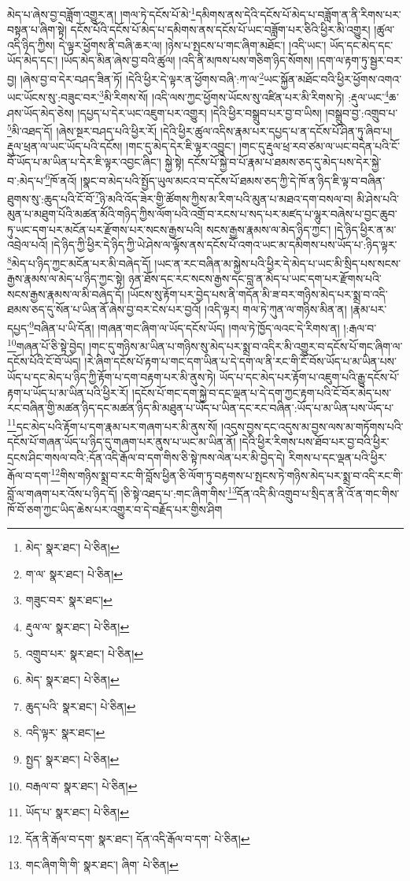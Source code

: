 མེད་པ་ཞེས་བྱ་བཟློག་འགྱུར་ན། །གལ་ཏེ་དངོས་པོ་མེ་\footnote{མེད་  སྣར་ཐང་།  པེ་ཅིན། }དམིགས་ནས་དེའི་དངོས་པོ་མེད་པ་བཟློག་ན་ནི་རིགས་པར་བསྟན་པ་ཞིག་སྟེ། དངོས་པོའི་དངོས་པོ་མེད་པ་དམིགས་ནས་དངོས་པོ་ཡང་བཟློག་པར་ཅིའི་ཕྱིར་མི་འགྱུར། །ཚུལ་འདི་ཉིད་ཀྱིས། དེ་ལྟར་ཕྱོགས་ནི་བཞི་ཆར་ལ། །ཉེས་པ་སྤངས་པ་གང་ཞིག་མཐོང་། །འདི་ཡང་། ཡོད་དང་མེད་དང་ཡོད་མེད་དང་། །ཡོད་མེད་མིན་ཞེས་བྱ་བའི་ཚུལ། །འདི་ནི་མཁས་པས་གཅིག་ཉིད་སོགས། །དག་ལ་རྟག་ཏུ་སྦྱར་བར་བྱ། །ཞེས་བྱ་བ་དེར་བཤད་ཟིན་ཏོ། །དེའི་ཕྱིར་དེ་ལྟར་ན་ཕྱོགས་བཞི་:ཀ་ལ་\footnote{ག་ལ་  སྣར་ཐང་།  པེ་ཅིན། }ཡང་སྐྱོན་མཐོང་བའི་ཕྱིར་ཕྱོགས་འགའ་ཡང་ཡོངས་སུ་:བཟུང་བར་\footnote{གཟུང་བར་  སྣར་ཐང་། }མི་རིགས་སོ། །འདི་ལས་ཀྱང་ཕྱོགས་ཡོངས་སུ་འཛིན་པར་མི་རིགས་ཏེ། :རྡུལ་ཡང་\footnote{རྡུལ་ལ་  སྣར་ཐང་།  པེ་ཅིན། }ཆ་ཤས་ཡོད་མེད་ཅེས། །དཔྱད་པ་དེར་ཡང་འཇུག་པར་འགྱུར། །དེའི་ཕྱིར་བསྒྲུབ་པར་བྱ་བ་ཡིས། །བསྒྲུབ་བྱ་:འགྲུབ་པ་\footnote{འགྲུབ་པར་  སྣར་ཐང་།  པེ་ཅིན། }མི་འཐད་དོ། །ཞེས་སྔར་བཤད་པའི་ཕྱིར་རོ། །དེའི་ཕྱིར་ཚུལ་འདིས་རྣམ་པར་དཔྱད་པ་ན་དངོས་པོ་ཤིན་ཏུ་ཞིབ་པ། རྡུལ་ཕྲན་ལ་ཡང་ཡོད་པའི་དངོས། །གང་དུ་མེད་དེར་ཇི་ལྟར་འབྱུང་། །གང་དུ་རྡུལ་ཕྲ་རབ་ཙམ་ལ་ཡང་བདེན་པའི་ངོ་བོ་ཡོད་པ་མ་ཡིན་པ་དེར་ཇི་ལྟར་འབྱང་ཞིང་། སྐྱེ་སྟེ། དངོས་པོ་སྐྱེ་བ་པོ་རྣམ་པ་ཐམས་ཅད་དུ་མེད་པས་དེར་སྐྱེ་བ་:མེད་པ་\footnote{མེད་  སྣར་ཐང་།  པེ་ཅིན། }ཁོ་ནའོ། །སྣང་བ་མེད་པའི་སྤྱོད་ཡུལ་མངའ་བ་དངོས་པོ་ཐམས་ཅད་ཀྱི་དེ་ཁོ་ན་ཉིད་ཇི་ལྟ་བ་བཞིན་ཐུགས་སུ་:ཆུད་པའི་ངོ་བོ་\footnote{ཆུད་པའི་  སྣར་ཐང་།  པེ་ཅིན། }ཉི་མའི་འོད་ཟེར་གྱི་ཚོགས་ཀྱིས་མ་རིག་པའི་མུན་པ་མཐའ་དག་བསལ་བ། མི་ཤེས་པའི་མུན་པ་མཐུག་པོའི་མཚན་མོའི་གཉིད་ཀྱིས་ལོག་པའི་འགྲོ་བ་རངས་པ་སད་པར་མཛད་པ་ལྷུར་བཞེས་པ་བྱང་ཆུབ་ཏུ་ཡང་དག་པར་མངོན་པར་རྫོགས་པར་སངས་རྒྱས་པའི། སངས་རྒྱས་རྣམས་ལ་མེད་ཉིད་ཀྱང་། །དེ་ཉིད་ཕྱིར་ན་མ་འབྲེལ་པའོ། །དེ་ཉིད་ཀྱི་ཕྱིར་དེ་ཉིད་ཀྱི་ཡེ་ཤེས་ལ་ལྟོས་ནས་དངོས་པོ་འགའ་ཡང་མ་དམིགས་པས་ཡོད་པ་:ཉིད་ལྟར་\footnote{འདི་ལྟར་  སྣར་ཐང་། }མེད་པ་ཉིད་ཀྱང་མངོན་པར་མི་བཞེད་དོ། །ཡང་ན་རང་བཞིན་མ་སྐྱེས་པའི་ཕྱིར་དེ་མེད་པ་ཡང་མི་སྲིད་པས་སངས་རྒྱས་རྣམས་ལ་མེད་པ་ཉིད་ཀྱང་སྟེ། ཉན་ཐོས་དང་རང་སངས་རྒྱས་དང་བླ་ན་མེད་པ་ཡང་དག་པར་རྫོགས་པའི་སངས་རྒྱས་རྣམས་ལ་མི་བཞེད་དོ། །ཡོངས་སུ་རྟོག་པར་བྱེད་པས་ནི་གདོན་མི་ཟ་བར་གཉིས་མེད་པར་སྨྲ་བ་འདི་ཐམས་ཅད་དུ་སོན་པ་ཡིན་ནོ་ཞེས་བྱ་བར་ངེས་པར་བྱའོ། །འདི་ལྟར། གལ་ཏེ་ཀུན་ལ་གཉིས་མིན་ན། །རྣམ་པར་དཔྱད་\footnote{སྤྱད་  སྣར་ཐང་།  པེ་ཅིན། }བཞིན་པ་ཡི་དོན། །གཞན་གང་ཞིག་ལ་ཡོད་དངོས་ཡོད། །གལ་ཏེ་ཁྱོད་ལའང་དེ་རིགས་ན། །:རྒལ་བ་\footnote{བརྒལ་བ་  སྣར་ཐང་།  པེ་ཅིན། }གཞན་པོ་ཅི་སྟེ་བྱེད། །གང་དུ་གཉིས་མ་ཡིན་པ་གཉིས་སུ་མེད་པར་སྨྲ་བ་འདིར་མི་འགྱུར་བ་དངོས་པོ་གང་ཞིག་ལ་དངོས་པོའི་ངོ་བོ་ཡོད། །རེ་ཞིག་དངོས་པོ་རྟག་པ་གང་དག་ཡིན་པ་དེ་དག་ལ་ནི་རང་གི་ངོ་བོས་ཡོད་པ་མ་ཡིན་པས་ཡོད་པ་དང་མེད་པ་ཉིད་ཀྱི་རྟོག་པ་དག་བརྟག་པར་མི་ནུས་ཏེ། ཡོད་པ་དང་མེད་པར་རྟོག་པ་འཇུག་པའི་རྒྱུ་དངོས་པོ་རྟག་པ་ཡོད་པ་མ་ཡིན་པའི་ཕྱིར་རོ། །དངོས་པོ་གང་དག་སྐྱེ་བ་དང་ལྡན་པ་དེ་དག་ཀྱང་རྟག་པའི་ངོ་བོར་མེད་པས་རང་བཞིན་གྱི་མཚན་ཉིད་དང་མཚན་ཉིད་མི་མཐུན་པ་ཡོད་པ་ཡིན་དང་རང་བཞིན་:ཡོད་པ་མ་ཡིན་པས་ཡོད་པ་\footnote{ཡོད་པ་  སྣར་ཐང་།  པེ་ཅིན། }དང་མེད་པའི་རྟོག་པ་དག་རྣམ་པར་གཞག་པར་མི་ནུས་སོ། །འདུས་བྱས་དང་འདུས་མ་བྱས་ལས་མ་གཏོགས་པའི་དངོས་པོ་གཞན་ཡོད་པ་ཉིད་དུ་གཞག་པར་ནུས་པ་ཡང་མ་ཡིན་ནོ། །དེའི་ཕྱིར་རིགས་པས་ཐོབ་པར་བྱ་བའི་ཕྱིར་དྲངས་ཤིང་གསལ་བའི་:དོན་འདི་རྒོལ་བ་དག་གིས་ཅི་སྟེ་ཁས་ལེན་པར་མི་བྱེད་དེ། རིགས་པ་དང་ལྡན་པའི་ཕྱིར་རྒོལ་བ་དག་\footnote{དོན་ནི་རྒོལ་བ་དག་  སྣར་ཐང་། དོན་འདི་རྒོལ་བ་དག་  པེ་ཅིན། }གིས་གཉིས་སྨྲ་བ་རང་གི་བློས་ཕྱིན་ཅི་ལོག་ཏུ་བརྟགས་པ་སྤངས་ཏེ་གཉིས་མེད་པར་སྨྲ་བ་འདི་རང་གི་བློ་ལ་གཞག་པར་འོས་པ་ཉིད་དོ། །ཅི་སྟེ་འཐད་པ་:གང་ཞིག་གིས་\footnote{གང་ཞིག་ིག་གི་  སྣར་ཐང་། ཞིག་  པེ་ཅིན། }དོན་འདི་མི་འགྲུབ་པ་སྲིད་ན་ནི་འོ་ན་གང་གིས་ཁོ་བོ་ཅག་ཀྱང་ཡིད་ཆེས་པར་འགྱུར་བ་དེ་བརྗོད་པར་གྱིས་ཤིག 